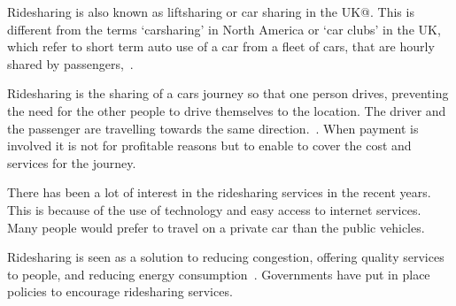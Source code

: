 Ridesharing is also known as liftsharing or car sharing in the UK@. This is different from the terms `carsharing' in North America or `car clubs' in the UK, which refer to short term auto use of a car from a fleet of cars, that are hourly shared by passengers,~\cite{Shaheen2009}.

Ridesharing is the sharing of a cars journey so that one person drives, preventing the need for the other people to drive themselves to the location. The driver and the passenger are travelling towards the same direction.~\cite{Chan2012}. When payment is involved it is not for profitable reasons but to enable to cover the cost and services for the journey.

There has been a lot of interest in the ridesharing services in the recent years. This is because of the use of technology and easy access to internet services. Many people would prefer to travel on a private car than the public vehicles.

Ridesharing is seen as a solution to reducing congestion,  offering quality services to people, and reducing energy consumption~\cite{Noland2006}. Governments have put in place policies to encourage ridesharing services.